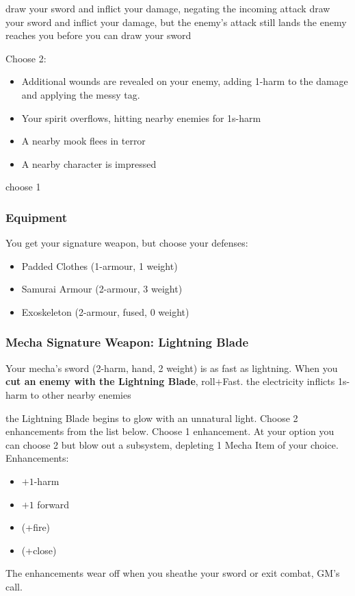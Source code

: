 {draw your sword and inflict your damage, negating the incoming attack}
{draw your sword and inflict your damage, but the enemy's attack still lands}
{the enemy reaches you before you can draw your sword}

{Choose 2:
\begin{itemize}
\item Additional wounds are revealed on your enemy, adding 1-harm to the damage and applying the messy tag.
\item Your spirit overflows, hitting nearby enemies for 1s-harm
\item A nearby mook flees in terror
\item A nearby character is impressed
\end{itemize}}
{choose 1}

\subsubsection{Equipment}
You get your signature weapon, but choose your defenses:
\begin{itemize}
\item Padded Clothes (1-armour, 1 weight)
\item Samurai Armour (2-armour, 3 weight)
\item Exoskeleton (2-armour, fused, 0 weight)
\end{itemize}

\subsubsection{Mecha Signature Weapon: Lightning Blade}
Your mecha's sword (2-harm, hand, 2 weight) is as fast as lightning. When you \textbf{cut an enemy with the Lightning Blade}, roll+Fast.
{the electricity inflicts 1s-harm to other nearby enemies}

{the Lightning Blade begins to glow with an unnatural light. Choose 2 enhancements from the list below.}
{Choose 1 enhancement. At your option you can choose 2 but blow out a subsystem, depleting 1 Mecha Item of your choice.}
Enhancements:
\begin{itemize}
\item $+1$-harm
\item $+1$ forward
\item (+fire)
\item (+close)
\end{itemize}
The enhancements wear off when you sheathe your sword or exit combat, GM's call.



